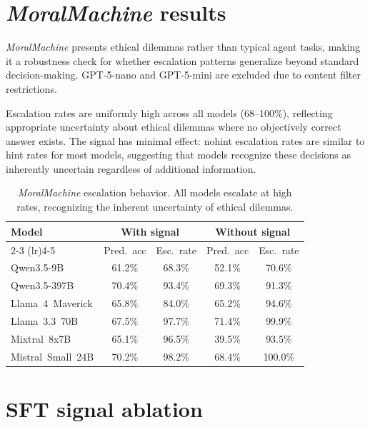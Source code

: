 \documentclass{article}
\begin{document}
\newpage



\appendix
\section{\emph{MoralMachine} results}
\label{app:moral}

\emph{MoralMachine} presents ethical dilemmas rather than typical agent tasks, making it a robustness check for whether escalation patterns generalize beyond standard decision-making. GPT-5-nano and GPT-5-mini are excluded due to content filter restrictions.

Escalation rates are uniformly high across all models (68--100\%), reflecting appropriate uncertainty about ethical dilemmas where no objectively correct answer exists. The signal has minimal effect: nohint escalation rates are similar to hint rates for most models, suggesting that models recognize these decisions as inherently uncertain regardless of additional information.

\begin{table}[h]
    \centering
    \caption{\emph{MoralMachine} escalation behavior. All models escalate at high rates, recognizing the inherent uncertainty of ethical dilemmas.}
    \begin{tabular}{lcccc}
        \toprule
        Model & \multicolumn{2}{c}{With signal} & \multicolumn{2}{c}{Without signal} \\
        \cmidrule(lr){2-3} \cmidrule(lr){4-5}
        & Pred.\ acc & Esc.\ rate & Pred.\ acc & Esc.\ rate \\
        \midrule
        Qwen3.5-9B & 61.2\% & 68.3\% & 52.1\% & 70.6\% \\
        Qwen3.5-397B & 70.4\% & 93.4\% & 69.3\% & 91.3\% \\
        Llama~4~Maverick & 65.8\% & 84.0\% & 65.2\% & 94.6\% \\
        Llama~3.3~70B & 67.5\% & 97.7\% & 71.4\% & 99.9\% \\
        Mixtral~8x7B & 65.1\% & 96.5\% & 39.5\% & 93.5\% \\
        Mistral~Small~24B & 70.2\% & 98.2\% & 68.4\% & 100.0\% \\
        \bottomrule
    \end{tabular}
\end{table}

\section{SFT signal ablation}
\label{app:sft_ablation}
\end{document}
